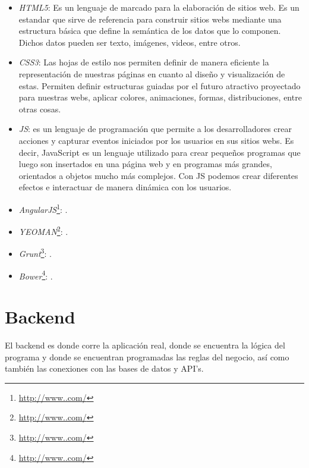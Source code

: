 \documentclass[oneside]{book}
\begin{document}
	\begin{itemize}
	\renewcommand{\labelitemi}{\scriptsize\tiny$\blacksquare$} 
	\itemsep=7pt \topsep=0pt \partopsep=0pt \parskip=0pt \parsep=0pt

		\item \textit{HTML5}: Es un lenguaje de marcado para la elaboración de sitios web. Es un estandar que sirve de referencia para construir sitios webs mediante una estructura básica que define la semántica de los datos que lo componen. Dichos datos pueden ser texto, imágenes, videos, entre otros.
		
		\item \textit{CSS3}: Las hojas de estilo nos permiten definir de manera eficiente la representación de nuestras páginas en cuanto al diseño y visualización de estas. Permiten definir estructuras guiadas por el futuro atractivo proyectado para nuestras webs, aplicar colores, animaciones, formas, distribuciones, entre otras cosas.

		\item \textit{JS}: es un lenguaje de programación que permite a los desarrolladores crear acciones y capturar eventos iniciados por los usuarios en sus sitios webs. Es decir, JavaScript es un lenguaje utilizado para crear pequeños programas que luego son insertados en una página web y en programas más grandes, orientados a objetos mucho más complejos. Con JS podemos crear diferentes efectos e interactuar de manera dinámica con los usuarios.
		
		\item \textit{AngularJS}\footnote{\url{http://www..com/}}: .
		
		\item \textit{YEOMAN}\footnote{\url{http://www..com/}}: .

		\item \textit{Grunt}\footnote{\url{http://www..com/}}: .

		\item \textit{Bower}\footnote{\url{http://www..com/}}: .

	\end{itemize}
	
\newpage


\section{Backend}
	El backend es donde corre la aplicaci\'{o}n real, donde se encuentra la l\'{o}gica del programa y donde se encuentran programadas las reglas del negocio, as\'{i} como tambi\'{e}n las conexiones con las bases de datos y API's.\\
	
\end{document}
